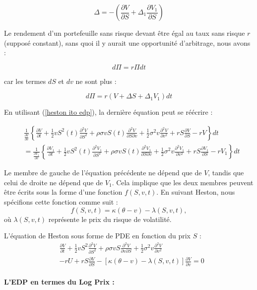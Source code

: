 \[
\Delta = -\left( \frac{\partial V}{\partial S} + \Delta_1 \frac{\partial V_1}{\partial S} \right)
\]

Le rendement d’un portefeuille sans risque devant être égal au taux sans risque \( r \) (supposé constant), sans quoi il y aurait une opportunité d’arbitrage, nous avons :

\[
d\Pi = r \Pi dt
\]

car les termes \( dS \) et \( dv \) ne sont plus :

\[
d\Pi = r (V + \Delta S + \Delta_1 V_1) dt
\]

En utilisant (\ref{heston ito edp}), la dernière équation peut se réécrire :

\begin{equation} \label{}
\begin{split}
 & \frac{1}{\frac{\partial V}{\partial v}} \left\{ \frac{\partial V}{\partial t} + \frac{1}{2} v S^2(t) \frac{\partial^2 V}{\partial S^2} + \rho \sigma v S(t) \frac{\partial^2 V}{\partial S \partial v} + \frac{1}{2} \sigma^2 v \frac{\partial^2 V}{\partial v^2} + r S \frac{\partial V}{\partial S} - r V \right\} dt \\
 & = \frac{1}{\frac{\partial V_1}{\partial v}} \left\{ \frac{\partial V_1}{\partial t} + \frac{1}{2} v S^2(t) \frac{\partial^2 V_1}{\partial S^2} + \rho \sigma v S(t) \frac{\partial^2 V_1}{\partial S \partial v} + \frac{1}{2} \sigma^2 v \frac{\partial^2 V_1}{\partial v^2} + r S \frac{\partial V_1}{\partial S} - r V_1 \right\} dt
\end{split}
\end{equation}

Le membre de gauche de l'équation précédente ne dépend que de $V$, tandis que celui de droite ne dépend que de $V_1$. Cela implique que les deux membres peuvent être écrits sous la forme d'une fonction $f(S, v, t)$. En suivant Heston, nous spécifions cette fonction comme suit :
\begin{equation}
 f(S, v, t) = \kappa(\theta - v) - \lambda(S, v, t),
\end{equation}
 où $\lambda(S, v, t)$ représente le prix du risque de volatilité.

L'équation de Heston sous forme de PDE en fonction du prix $S$ :
\begin{equation} \label{heston edp}
\begin{split}
& \frac{\partial V}{\partial t} + \frac{1}{2} v S^2 \frac{\partial^2 V}{\partial S^2} + \rho \sigma v S \frac{\partial^2 V}{\partial v \partial S} + \frac{1}{2} \sigma^2 v \frac{\partial^2 V}{\partial v^2} \\
&  - rU + rS \frac{\partial V}{\partial S} - [\kappa(\theta - v) - \lambda(S, v, t)] \frac{\partial V}{\partial v} = 0
 \end{split}
\end{equation}
\\
\textbf{L'EDP en termes du Log Prix :}\\

